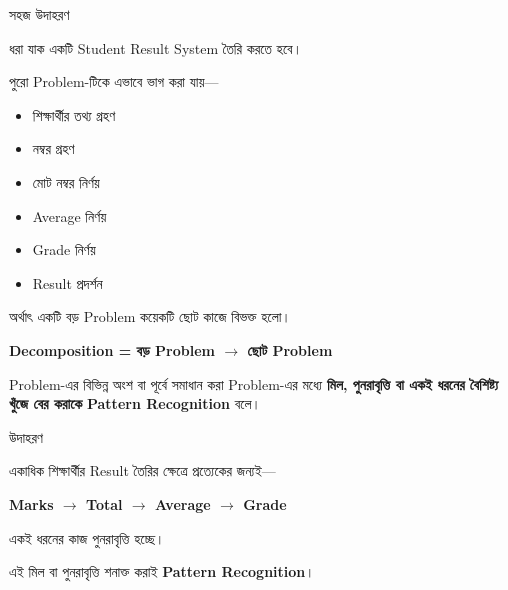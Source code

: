 \begin{examplebox}{সহজ উদাহরণ}

ধরা যাক একটি Student Result System তৈরি করতে হবে।

পুরো Problem-টিকে এভাবে ভাগ করা যায়—

\begin{itemize}

\item শিক্ষার্থীর তথ্য গ্রহণ
\item নম্বর গ্রহণ
\item মোট নম্বর নির্ণয়
\item Average নির্ণয়
\item Grade নির্ণয়
\item Result প্রদর্শন

\end{itemize}

অর্থাৎ একটি বড় Problem কয়েকটি ছোট কাজে বিভক্ত হলো।

\end{examplebox}

\begin{center}

\textbf{
Decomposition
=
বড় Problem
\(\longrightarrow\)
ছোট Problem
}

\end{center}


\begin{definitionbox}

Problem-এর বিভিন্ন অংশ বা পূর্বে সমাধান করা Problem-এর মধ্যে
\textbf{মিল, পুনরাবৃত্তি বা একই ধরনের বৈশিষ্ট্য খুঁজে বের করাকে}
\textbf{Pattern Recognition} বলে।

\end{definitionbox}

\begin{examplebox}{উদাহরণ}

একাধিক শিক্ষার্থীর Result তৈরির ক্ষেত্রে প্রত্যেকের জন্যই—

\begin{center}

\textbf{
Marks
\(\longrightarrow\)
Total
\(\longrightarrow\)
Average
\(\longrightarrow\)
Grade
}

\end{center}

একই ধরনের কাজ পুনরাবৃত্তি হচ্ছে।

এই মিল বা পুনরাবৃত্তি শনাক্ত করাই
\textbf{Pattern Recognition}।

\end{examplebox}

